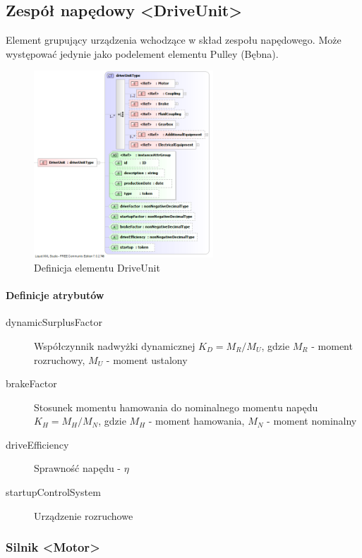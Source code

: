 \documentclass[12pt,a4paper]{article}
\begin{document}
\subsection{Zespół napędowy <DriveUnit>}
Element grupujący urządzenia wchodzące w skład zespołu napędowego. Może
występować jedynie jako podelement elementu Pulley (Bębna).

\begin{figure}[H]
  \centering
  \includegraphics[width=0.6\textwidth]{png/liquid/DriveUnit}
  \caption{Definicja elementu DriveUnit}
  \label{fig:driveUnit-xsd}
\end{figure}

\paragraph{Definicje atrybutów}
\begin{description}
\item[dynamicSurplusFactor] Współczynnik nadwyżki dynamicznej $K_D = M_R/M_U$,
  gdzie $M_R$ - moment rozruchowy, $M_U$ - moment ustalony
\item[brakeFactor] Stosunek momentu hamowania do nominalnego momentu napędu $K_H
  = M_H/M_N$, gdzie $M_H$ - moment hamowania, $M_N$ - moment nominalny
\item[driveEfficiency] Sprawność napędu - $\eta$
\item[startupControlSystem] Urządzenie rozruchowe
\end{description}

\subsubsection{Silnik <Motor>}
\end{document}
